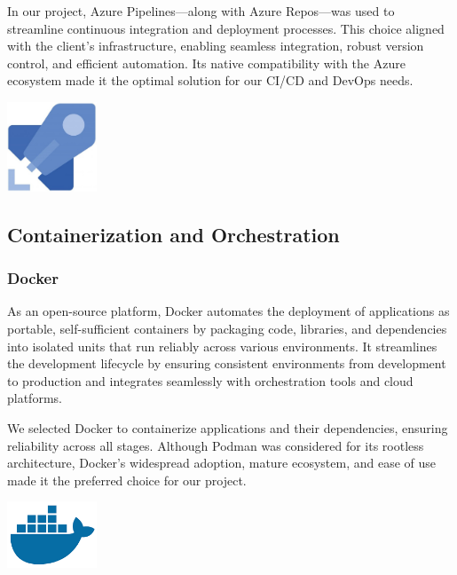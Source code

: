In our project, Azure Pipelines—along with Azure Repos—was used to streamline continuous integration and deployment processes. This choice aligned with the client’s infrastructure, enabling seamless integration, robust version control, and efficient automation. Its native compatibility with the Azure ecosystem made it the optimal solution for our CI/CD and DevOps needs.

\begin{center}
    \centering
    \includegraphics[width=0.2\textwidth]{Images/Azure Pipelines Logo.jpg}
     \cite{azure_pipelines_logo}
    \label{fig:azure_pipelines_logo}
\end{center}

\subsection{Containerization and Orchestration}

\subsubsection{Docker}
As an open-source platform, Docker automates the deployment of applications as portable, self-sufficient containers by packaging code, libraries, and dependencies into isolated units that run reliably across various environments. It streamlines the development lifecycle by ensuring consistent environments from development to production and integrates seamlessly with orchestration tools and cloud platforms.\mynewline

We selected Docker to containerize applications and their dependencies, ensuring reliability across all stages. Although Podman was considered for its rootless architecture, Docker’s widespread adoption, mature ecosystem, and ease of use made it the preferred choice for our project.

\begin{center}
    \centering
    \includegraphics[width=0.2\textwidth]{Images/Docker Logo.png}
     \cite{docker_logo}
    \label{fig:docker_logo}
\end{center}

